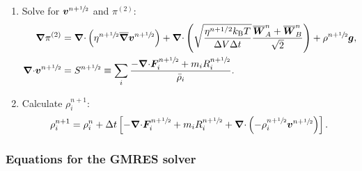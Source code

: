 \documentclass[
10pt
showpacs, showkeys,
amsmath,amssymb,
aps,
pre,
floatfix,
]{revtex4-1}
\newcommand{\divg}{{\V\nabla\cdot}}                       %
\newcommand{\paren}[1]{{(#1)}}                            %
\begin{document}
\begin{enumerate}
\item Solve for $\boldsymbol{v}^{n+\sfrac{1}{2}}$ and $\pi^\paren{2}$:
\begin{align}
\label{overdamped_stokes_v_2nd}
\grad\pi^\paren{2} &= \divg\left( \eta^{n+\myhalf} \overline{\grad}\V{v}^{n+\myhalf} \right) 
+ \divg\left( \sqrt{\frac{\eta^{n+1/2} k_\mathrm{B}T}{\D{V}\D{t}} } \frac{\overline{\V{W}}^n_A + \overline{\V{W}}^n_B}{\sqrt{2}} \right) + \rho^{n+\myhalf}\V{g},\\
\label{overdamped_stokes_p_2nd}
\divg\V{v}^{n+\myhalf} &= S^{n+\myhalf}\equiv \sum_i \frac{-\divg\V{F}^{n+\myhalf}_i + m_i R^{n+\myhalf}_i }{\bar{\rho}_i}.
\end{align}

\item Calculate $\rho^{n+1}_i$:
\begin{equation}
\rho^{n+1}_i = \rho^n_i + \D{t} \left[ -\divg\V{F}^{n+\myhalf}_i + m_i R^{n+\myhalf}_i + \divg\left( -\rho^{n+\myhalf}_i \V{v}^{n+\myhalf} \right) \right].
\end{equation} 

\end{enumerate}



\subsubsection{Equations for the GMRES solver}
\end{document}
